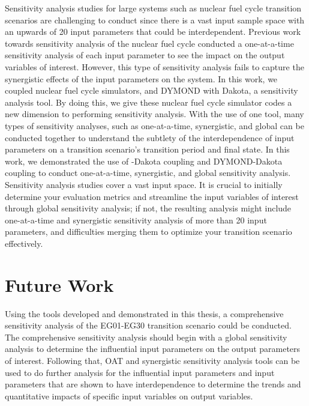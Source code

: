 Sensitivity analysis studies for large systems such as nuclear 
fuel cycle transition scenarios are challenging to conduct 
since there is a vast input sample space with an
upwards of 20 input parameters that could be interdependent. 
Previous work towards sensitivity analysis of the nuclear fuel cycle 
conducted a one-at-a-time sensitivity analysis of each input parameter 
to see the impact on the output variables of interest.
However, this type of sensitivity analysis fails to capture the 
synergistic effects of the input parameters on the system.  
In this work, we coupled nuclear fuel cycle simulators, \Cyclus and 
DYMOND with Dakota, a sensitivity analysis tool. 
By doing this, we give these nuclear fuel cycle simulator codes 
a new dimension to performing sensitivity analysis.
With the use of one tool, many types of sensitivity analyses, 
such as one-at-a-time, synergistic, and global 
can be conducted together to understand the subtlety of the 
interdependence of input parameters on a transition scenario's 
transition period and final state. 
In this work, we demonstrated the use of \Cyclus-Dakota coupling 
and DYMOND-Dakota coupling to conduct one-at-a-time, synergistic, and 
global sensitivity analysis. 
Sensitivity analysis studies cover a vast input space. 
It is crucial to initially determine your evaluation metrics and 
streamline the input variables of interest through global sensitivity 
analysis; if not, the resulting analysis might include one-at-a-time and 
synergistic sensitivity analysis of more than 20 input parameters, 
and difficulties merging them to optimize your transition scenario 
effectively.

\section{Future Work}
Using the tools developed and demonstrated in this thesis, a comprehensive 
sensitivity analysis of the EG01-EG30 transition scenario could be conducted. 
The comprehensive sensitivity analysis should begin with a global
sensitivity analysis to determine the influential input parameters 
on the output parameters of interest. 
Following that, OAT and synergistic sensitivity analysis tools can 
be used to do further analysis for the influential input parameters and 
input parameters that are shown to have interdependence to 
determine the trends and quantitative impacts of specific input variables 
on output variables.  

